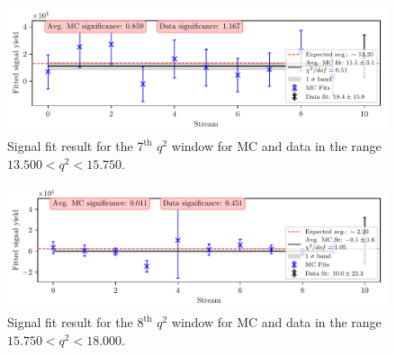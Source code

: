 \begin{figure}[H]
	\centering
	\captionsetup{width=0.8\linewidth}
	\includegraphics[width=\linewidth]{fig/sig_q2_7}
	\caption{Signal fit result for the $7^{\mathrm{th}}$ $q^2$ window for MC and data in the range $13.500  < q^2 < 15.750$.}
\end{figure}

\begin{figure}[H]
	\centering
	\captionsetup{width=0.8\linewidth}
	\includegraphics[width=\linewidth]{fig/sig_q2_8}
	\caption{Signal fit result for the $8^{\mathrm{th}}$ $q^2$ window for MC and data in the range $15.750  < q^2 < 18.000$.}
\end{figure}
